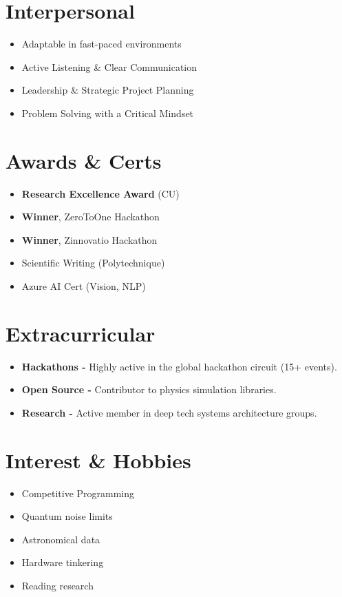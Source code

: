 \documentclass[9pt,a4paper]{extarticle}
\begin{document}
{\begin{minipage}[t]{\dimexpr0.34\textwidth-2\fboxsep\relax}
\section{Interpersonal}
\begin{itemize}[leftmargin=12pt, itemsep=1pt, parsep=0pt]
    \item Adaptable in fast-paced environments
    \item Active Listening \& Clear Communication
    \item Leadership \& Strategic Project Planning
    \item Problem Solving with a Critical Mindset
\end{itemize}

\section{Awards \& Certs}
\begin{itemize}[leftmargin=12pt, itemsep=1pt, parsep=0pt]
    \item \textbf{Research Excellence Award} (CU)
    \item \textbf{Winner}, ZeroToOne Hackathon
    \item \textbf{Winner}, Zinnovatio Hackathon
    \item Scientific Writing (Polytechnique)
    \item Azure AI Cert (Vision, NLP)
\end{itemize}

\section{Extracurricular}
\begin{itemize}[leftmargin=12pt, itemsep=1pt, parsep=0pt]
    \item \textbf{Hackathons -} Highly active in the global hackathon circuit (15+ events).
    \item \textbf{Open Source -} Contributor to physics simulation libraries.
    \item \textbf{Research -} Active member in deep tech systems architecture groups.
\end{itemize}

\section{Interest \& Hobbies}
\begin{itemize}[leftmargin=12pt, itemsep=1pt, parsep=0pt]
    \item Competitive Programming
    \item Quantum noise limits
    \item Astronomical data
    \item Hardware tinkering
    \item Reading research
\end{itemize}


\end{minipage}}
\end{document}
